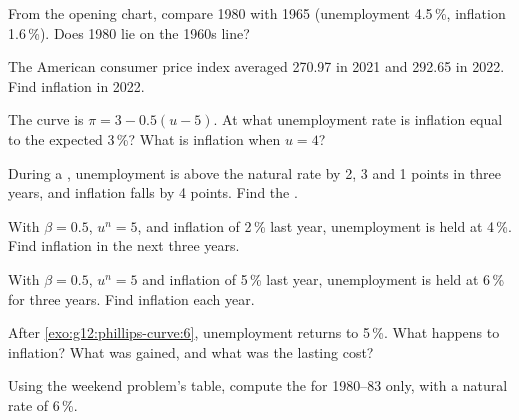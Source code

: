 \begin{exercise}[$\star$]\label{exo:g12:phillips-curve:2}
From the opening chart, compare 1980 with 1965 (unemployment 4.5\,\%, inflation 1.6\,\%). Does 1980 lie on the 1960s line?
\end{exercise}

\begin{exercise}[$\star$]\label{exo:g12:phillips-curve:3}
The American consumer price index averaged 270.97 in 2021 and 292.65 in 2022. Find inflation in 2022.
\end{exercise}

\begin{exercise}[$\star$]\label{exo:g12:phillips-curve:4}
The curve is $\pi = 3 - 0.5(u - 5)$. At what unemployment rate is inflation equal to the expected 3\,\%? What is inflation when $u = 4$?
\end{exercise}

\begin{exercise}[$\star$]\label{exo:g12:phillips-curve:5}
During a , unemployment is above the natural rate by 2, 3 and 1 points in three years, and inflation falls by 4 points. Find the .
\end{exercise}

\begin{exercise}[$\star\star$]\label{exo:g12:phillips-curve:6}
With $\beta = 0.5$, $u^n = 5$,  and inflation of 2\,\% last year, unemployment is held at 4\,\%. Find inflation in the next three years.
\end{exercise}

\begin{exercise}[$\star\star$]\label{exo:g12:phillips-curve:7}
With $\beta = 0.5$, $u^n = 5$ and inflation of 5\,\% last year, unemployment is held at 6\,\% for three years. Find inflation each year.
\end{exercise}

\begin{exercise}[$\star\star$]\label{exo:g12:phillips-curve:8}
After \cref{exo:g12:phillips-curve:6}, unemployment returns to 5\,\%. What happens to inflation? What was gained, and what was the lasting cost?
\end{exercise}

\begin{exercise}[$\star\star$]\label{exo:g12:phillips-curve:9}
Using the weekend problem's table, compute the  for 1980--83 only, with a natural rate of 6\,\%.
\end{exercise}

